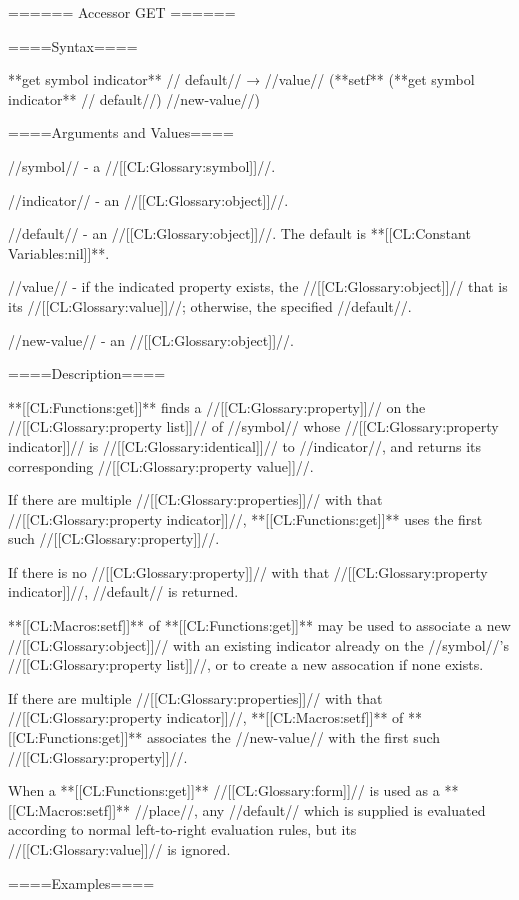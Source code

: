 ====== Accessor GET ======

====Syntax====

**get {symbol indicator** //\opt} default// → //value// (**setf** (**get {symbol indicator** //\opt} default//) //new-value//)

====Arguments and Values====

//symbol// - a //[[CL:Glossary:symbol]]//.

//indicator// - an //[[CL:Glossary:object]]//.

//default// - an //[[CL:Glossary:object]]//. The default is **[[CL:Constant Variables:nil]]**.

//value// - if the indicated property exists, the //[[CL:Glossary:object]]// that is its //[[CL:Glossary:value]]//; otherwise, the specified //default//.

//new-value// - an //[[CL:Glossary:object]]//.

====Description====

**[[CL:Functions:get]]** finds a //[[CL:Glossary:property]]// on the //[[CL:Glossary:property list]]// of //symbol// whose //[[CL:Glossary:property indicator]]// is //[[CL:Glossary:identical]]// to //indicator//, and returns its corresponding //[[CL:Glossary:property value]]//.

If there are multiple //[[CL:Glossary:properties]]// with that //[[CL:Glossary:property indicator]]//, **[[CL:Functions:get]]** uses the first such //[[CL:Glossary:property]]//.

If there is no //[[CL:Glossary:property]]// with that //[[CL:Glossary:property indicator]]//, //default// is returned.

**[[CL:Macros:setf]]** of **[[CL:Functions:get]]** may be used to associate a new //[[CL:Glossary:object]]// with an existing indicator already on the //symbol//'s //[[CL:Glossary:property list]]//, or to create a new assocation if none exists.

If there are multiple //[[CL:Glossary:properties]]// with that //[[CL:Glossary:property indicator]]//, **[[CL:Macros:setf]]** of **[[CL:Functions:get]]** associates the //new-value// with the first such //[[CL:Glossary:property]]//.

When a **[[CL:Functions:get]]** //[[CL:Glossary:form]]// is used as a **[[CL:Macros:setf]]** //place//, any //default// which is supplied is evaluated according to normal left-to-right evaluation rules, but its //[[CL:Glossary:value]]// is ignored.

====Examples====

